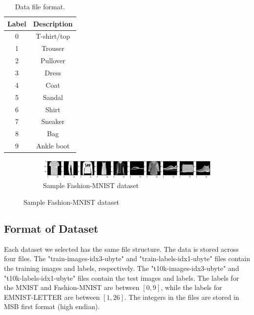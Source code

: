 \begin{table}[ht]
\centering
\begin{tabular}{|c|c|}
\hline
\textbf{Label} & \textbf{Description} \\ \hline
0  &   T-shirt/top \\ \hline
1  &   Trouser \\ \hline
2   &	Pullover \\ \hline
3   &	Dress \\ \hline
4   &	Coat \\ \hline
5   &	Sandal \\ \hline
6   &	Shirt \\ \hline
7   &	Sneaker \\ \hline
8   &	Bag \\ \hline
9   &	Ankle boot \\ \hline
\end{tabular}
\caption{Data file format.}
\label{tbl:MNIST-Fashion}
\end{table}

\begin{figure}[htb!]
        \centering
        \begin{subfigure}[b]{\textwidth}
            \centering
            \includegraphics[width=\linewidth]{images/fashion.png}
            \caption{Sample Fashion-MNIST dataset}
            \label{fig:EMNIST MNIST dataset}
        \end{subfigure}%
        \label{fig:Rotate-misclassifications}
    \end{figure}
    \FloatBarrier
    
\subsection{Format of Dataset}
Each dataset we selected has the same file structure. The data is stored across four files. The "train-images-idx3-ubyte" and "train-labels-idx1-ubyte" files contain the training images and labels, respectively. The "t10k-images-idx3-ubyte" and "t10k-labels-idx1-ubyte" files contain the test images and labels. The labels for the MNIST and Fashion-MNIST are between $[0, 9]$, while the labels for EMNIST-LETTER are between $[1, 26]$. The integers in the files are stored in MSB first format (high endian).

